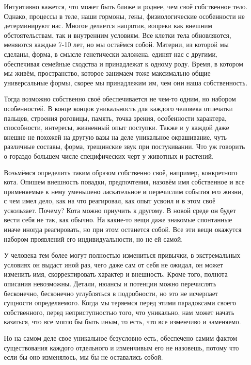 Интуитивно кажется, что может быть ближе и
роднее, чем своё собственное тело. Однако, процессы в теле, наши гормоны, гены,
физиологические особенности не детерминируют нас. Многое делается напротив,
вопреки как внешним обстоятельствам, так и внутренним условиям. Все клетки тела
обновляются, меняются каждые 7-10 лет, но мы остаёмся собой. Материи, из которой
мы сделаны, форма, в смысле генетически заложена, единят нас с другими,
обеспечивая семейные сходства и принадлежат к одному роду. Время, в котором мы
живём, пространство, которое занимаем тоже максимально общие универсальные
формы, скорее мы принадлежим им, чем они наша собственность. 

Тогда возможно
собственно своё обеспечивается не чем-то одним, но набором особенностей. В конце
концов уникальность для каждого человека отпечатки пальцев, строения роговицы,
память, точка зрения, особенности характера, способности, интересы, жизненный
опыт поступки. Также и у каждой даже внешне не похожей на другую вазы на деле
уникальное окрашивание, чуть различные составы, форма, трещинские звук при
постукивании. Что уж говорить о гораздо большем числе специфических черт у
животных и растений. 

Возьмёмся определить таким образом собственно своё,
например, конкретного кота. Опишем внешность повадки, предпочтения, назовём имя
собственное и все применяемые к нему уменьшено ласкательное и перечислим события
его жизни, с чем имел дело, как на что реагировал, как опыт усвоил и в этом своё
ускользает. Почему? Кота можно приучить к другому. В новой среде он будет вести
себя не так, как обычно. На какие-то вещи даже знакомые спонтанные иначе иногда
реагировать, но при этом останется собой. Все эти вещи окажутся набором
проявлений его индивидуальности, но не ей самой. 

У человека тем более могут
полностью измениться привычки, в экстремальных условиях он выдаст иной раз, чего
даже сам от себя не ожидал, он может изменить имя, скорректировать характер и
внешность. Кроме того, полнота описания невозможны. Детали, нюансы и потенции
можно перечислять бесконечно, бесконечно углубляться в подробности, но это не
исчерпает сущности определяемого. Когда мы теряемся перед этими парадоксами
своего собственного, перед неприступностью того, что уникально, нам может начать
казаться, что все могло бы быть иным, то есть, что все изменчиво и заменяемо. 

Но
на самом деле свое уникальное безусловно есть, обеспечено самим фактом
существования каждого отдельного и изменчивым его не назовешь, потому что если
бы оно изменялось, мы бы не оставались собой. 

